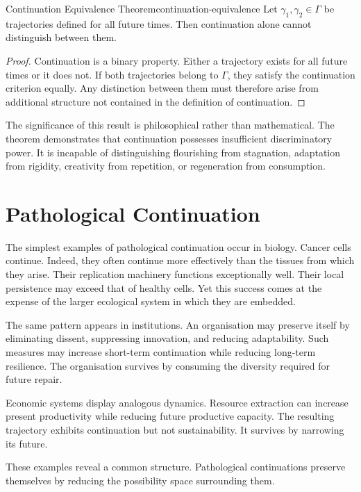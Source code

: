 \documentclass[12pt,twoside,openright]{book}
\begin{document}
\begin{theorem}{Continuation Equivalence Theorem}{continuation-equivalence}
  Let $\gamma_1,\gamma_2\in\Gamma$ be trajectories defined
  for all future times. Then continuation alone cannot
  distinguish between them.
\end{theorem}

\begin{proof}
  Continuation is a binary property. Either a trajectory
  exists for all future times or it does not. If both
  trajectories belong to $\Gamma$, they satisfy the
  continuation criterion equally. Any distinction between
  them must therefore arise from additional structure not
  contained in the definition of continuation.
\end{proof}

The significance of this result is philosophical rather
than mathematical. The theorem demonstrates that
continuation possesses insufficient discriminatory power.
It is incapable of distinguishing flourishing from
stagnation, adaptation from rigidity, creativity from
repetition, or regeneration from consumption.

\section{Pathological Continuation}
\label{sec:ch10-pathological}

The simplest examples of pathological continuation occur in
biology. Cancer cells continue. Indeed, they often continue
more effectively than the tissues from which they arise.
Their replication machinery functions exceptionally well.
Their local persistence may exceed that of healthy cells.
Yet this success comes at the expense of the larger
ecological system in which they are embedded.

The same pattern appears in institutions. An organisation
may preserve itself by eliminating dissent, suppressing
innovation, and reducing adaptability. Such measures may
increase short-term continuation while reducing long-term
resilience. The organisation survives by consuming the
diversity required for future repair.

Economic systems display analogous dynamics. Resource
extraction can increase present productivity while reducing
future productive capacity. The resulting trajectory
exhibits continuation but not sustainability. It survives
by narrowing its future.

These examples reveal a common structure. Pathological
continuations preserve themselves by reducing the
possibility space surrounding them.
\end{document}
